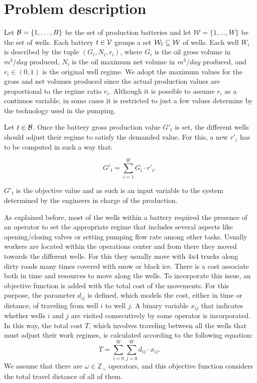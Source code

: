\section{Problem description} \label{sec:form}

Let ${\cal B} = \{1,\dots,B\}$ be the set of production batteries and let $\mathcal{W}=\{1,\ldots,W\}$ be the set of wells. Each battery $t\in {\cal V}$ groups a set ${\cal W}_t \subseteq {\cal W}$ of wells. Each well $W_i$ is described by the tuple $(G_i,N_i,r_i)$, where $G_i$ is the oil gross volume in $m^3/day$ produced, $N_i$ is the oil maximum net volume in $m^3/day$ produced, and $r_i \in (0,1)$ is the original well regime. We adopt the maximum values for the gross and net volumes produced since the actual production values are proportional to the regime ratio $r_i$. Although it is possible to assume $r_i$ as a continuos variable, in some cases it is restricted to just a few values determine by the technology used in the pumping. 

Let $t\in {\cal B}$. Once the battery gross production value $G'_t$ is set, the different wells should adjust their regime to satisfy the demanded value. For this, a new $r'_i$ has to be computed in such a way that:

\begin{equation} \label{eq:restr}
    G'_t = \sum_{i = 1}^{W} G_i \cdot r'_i.
\end{equation}

$G'_t$ is the objective value and as such is an input variable to the system determined by the engineers in charge of the production.

As explained before, most of the wells within a battery required the presence of an operator to set the appropriate regime that includes several aspects like opening/closing valves or setting pumping flow rate among other tasks. Usually workers are located within the operations center and from there they moved towards the different wells. For this they usually move with 4x4 trucks along dirty roads many times covered with snow or black ice. There is a cost associate both in time and resources to move along the wells. To incorporate this issue, an objective function is added with the total cost of the movements. For this purpose, the parameter $d_{ij}$ is defined, which models the cost, either in time or distance, of traveling from well $i$ to well $j$. A binary variable $x_{ij}$ that indicates whether wells $i$ and $j$ are visited consecutively by some operator is incorporated. In this way, the total cost $T$, which involves traveling between all the wells that must adjust their work regimes, is calculated according to the following equation:
\begin{equation} \label{eq:minT}
    T = \sum_{i = 0}^{W} \sum_{j = 0}^{W} d_{ij} \cdot x_{ij}.
\end{equation}
We assume that there are $\omega \in \mathbb{Z}_+$ operators, and this objective function considers the total travel distance of all of them. 

